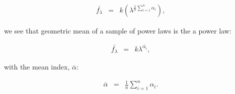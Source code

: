 \documentclass{aa}    %
\newcommand{\eqlabel}[1]{\label{eq:#1}}
\begin{document}
 \begin{eqnarray}\eqlabel{deriv2}
 \bar{f_{\lambda}} &=&  k \left( \lambda ^{ \frac{1}{n} \sum_{i=1}^n \alpha_{i}  }\right) ,
 \end{eqnarray}

we see that geometric mean of a sample of power laws is the a power law:

 \begin{eqnarray}\eqlabel{deriv3}
 \bar{f_{\lambda}} &=&  k \lambda ^{ \bar{\alpha_{i} }},
 \end{eqnarray}

with the mean index, $\bar{\alpha}$:

 \begin{eqnarray}\eqlabel{mean}
 \bar{\alpha} &=&  \frac{1}{n} \sum_{i=1}^n \alpha_{i} .
 \end{eqnarray}
\end{document}
